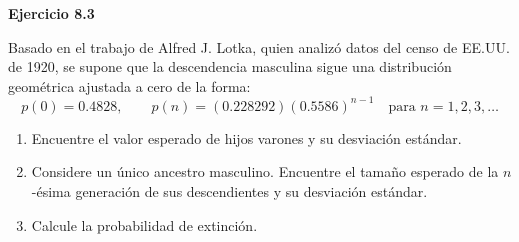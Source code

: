 \documentclass{article}
\begin{document}
\textbf{Ejercicio 8.3}

Basado en el trabajo de Alfred J. Lotka, quien analizó datos del censo de EE.UU. de 1920, se supone que la descendencia masculina sigue una distribución geométrica ajustada a cero de la forma:
\[
p(0) = 0.4828, \qquad p(n) = (0.228292)(0.5586)^{n-1} \quad \text{para } n = 1, 2, 3, \dots
\]

\begin{enumerate}
    \item[(a)] Encuentre el valor esperado de hijos varones y su desviación estándar.
    \item[(b)] Considere un único ancestro masculino. Encuentre el tamaño esperado de la $n$-ésima generación de sus descendientes y su desviación estándar.
    \item[(c)] Calcule la probabilidad de extinción.
\end{enumerate}
\end{document}
